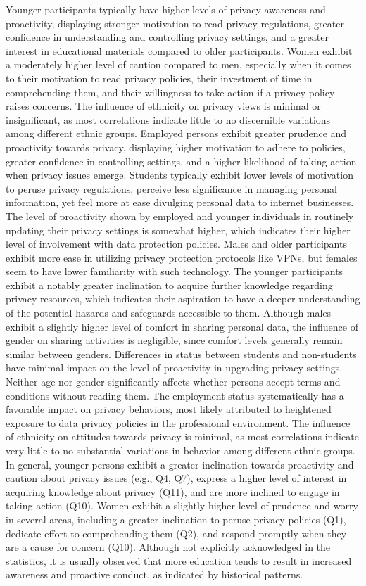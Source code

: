 Younger participants typically have higher levels of privacy awareness and proactivity, displaying stronger motivation to read privacy regulations, greater confidence in understanding and controlling privacy settings, and a greater interest in educational materials compared to older participants.
Women exhibit a moderately higher level of caution compared to men, especially when it comes to their motivation to read privacy policies, their investment of time in comprehending them, and their willingness to take action if a privacy policy raises concerns.
The influence of ethnicity on privacy views is minimal or insignificant, as most correlations indicate little to no discernible variations among different ethnic groups.
Employed persons exhibit greater prudence and proactivity towards privacy, displaying higher motivation to adhere to policies, greater confidence in controlling settings, and a higher likelihood of taking action when privacy issues emerge.
Students typically exhibit lower levels of motivation to peruse privacy regulations, perceive less significance in managing personal information, yet feel more at ease divulging personal data to internet businesses.
The level of proactivity shown by employed and younger individuals in routinely updating their privacy settings is somewhat higher, which indicates their higher level of involvement with data protection policies.
Males and older participants exhibit more ease in utilizing privacy protection protocols like VPNs, but females seem to have lower familiarity with such technology.
The younger participants exhibit a notably greater inclination to acquire further knowledge regarding privacy resources, which indicates their aspiration to have a deeper understanding of the potential hazards and safeguards accessible to them.
Although males exhibit a slightly higher level of comfort in sharing personal data, the influence of gender on sharing activities is negligible, since comfort levels generally remain similar between genders.
Differences in status between students and non-students have minimal impact on the level of proactivity in upgrading privacy settings.
Neither age nor gender significantly affects whether persons accept terms and conditions without reading them.
The employment status systematically has a favorable impact on privacy behaviors, most likely attributed to heightened exposure to data privacy policies in the professional environment.
The influence of ethnicity on attitudes towards privacy is minimal, as most correlations indicate very little to no substantial variations in behavior among different ethnic groups.
In general, younger persons exhibit a greater inclination towards proactivity and caution about privacy issues (e.g., Q4, Q7), express a higher level of interest in acquiring knowledge about privacy (Q11), and are more inclined to engage in taking action (Q10).
Women exhibit a slightly higher level of prudence and worry in several areas, including a greater inclination to peruse privacy policies (Q1), dedicate effort to comprehending them (Q2), and respond promptly when they are a cause for concern (Q10).
Although not explicitly acknowledged in the statistics, it is usually observed that more education tends to result in increased awareness and proactive conduct, as indicated by historical patterns.
